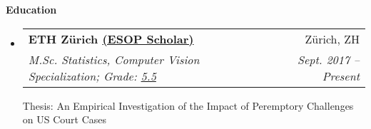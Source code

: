 \documentclass[letterpaper,11pt]{article}
\makeatletter
\newcommand{\resheading}[1]{\colorbox{resBlue}{\begin{minipage}{\textwidth}
			\textbf{#1}
\end{minipage}} \vspace{-14pt}}
\newcommand{\resitem}[4]{\begin{tabular*}{17.5cm}{l@{\extracolsep{\fill}}r} \textbf{#1} & #2 \\ \textit{#3} & \textit{#4} \\ \end{tabular*} \vspace{-6pt}}
\makeatother
\begin{document}
\resheading{Education}
\begin{itemize}
\item
	\resitem{ETH Z\"urich %
	 \href{https://www.ethz-foundation.ch/en/esop/}{(ESOP Scholar)}}{Z\"urich, ZH}{M.Sc. Statistics, Computer Vision Specialization;
	 Grade: \href{https://www.ethz.ch/content/dam/ethz/main/education/rechtliches-abschluesse/grading.pdf}{5.5}}{Sept. 2017 -- Present} \vspace{2pt}
	
	{\footnotesize Thesis: An Empirical Investigation of the Impact of Peremptory Challenges on US Court Cases \par \vspace{-4pt}
}
\end{itemize}
\end{document}
